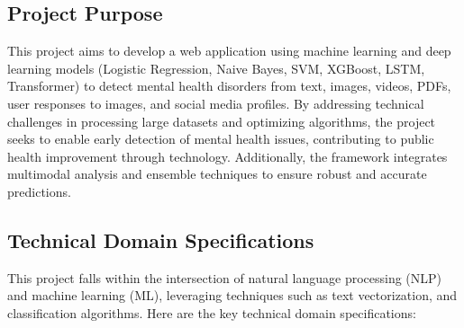 \subsection{Project Purpose}
\vspace{.1in}
\noindent
This project aims to develop a web application using machine learning and deep learning models (Logistic Regression, Naive Bayes, SVM, XGBoost, LSTM, Transformer) to detect mental health disorders from text, images, videos, PDFs, user responses to images, and social media profiles. By addressing technical challenges in processing large datasets and optimizing algorithms, the project seeks to enable early detection of mental health issues, contributing to public health improvement through technology. Additionally, the framework integrates multimodal analysis and ensemble techniques to ensure robust and accurate predictions.

\subsection{Technical Domain Specifications}
\vspace{.1in}
This project falls within the intersection of natural language processing (NLP) and machine learning (ML), leveraging techniques such as text vectorization, and classification algorithms. Here are the key technical domain specifications:

\newpage

